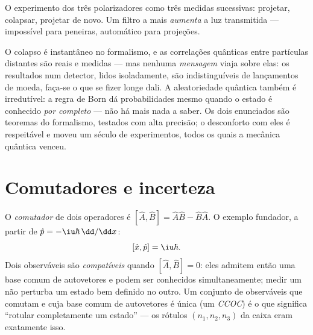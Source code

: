 \begin{omfigure}

{\small O experimento dos três polarizadores como três medidas
sucessivas: projetar, colapsar, projetar de novo. Um filtro a mais
\emph{aumenta} a luz transmitida --- impossível para peneiras,
automático para projeções.}
\end{omfigure}

\begin{remark}\label{rem:b3:quantum-formalism:nosignal}
O colapso é instantâneo no formalismo, e as correlações quânticas
entre partículas distantes são reais e medidas --- mas nenhuma
\emph{mensagem} viaja sobre elas: os resultados num detector, lidos
isoladamente, são indistinguíveis de lançamentos de moeda, faça-se o
que se fizer longe dali. A aleatoriedade quântica também é
irredutível: a regra de Born dá probabilidades mesmo quando o estado é
conhecido \emph{por completo} --- não há mais nada a saber. Os dois
enunciados são teoremas do formalismo, testados com alta precisão; o
desconforto com eles é respeitável e moveu um século de experimentos,
todos os quais a mecânica quântica venceu.
\end{remark}

\section{Comutadores e incerteza}

\begin{definition}\label{def:b3:quantum-formalism:commutator}
O \emph{comutador} de dois operadores é $[\hat A, \hat B] = \hat
A\hat B - \hat B\hat A$. O exemplo fundador, a partir de $\hat p =
-\iu\hbar\,\dd/\dd x$:
\[
[\hat x, \hat p] = \iu\hbar .
\]
Dois observáveis são \emph{compatíveis} quando $[\hat A, \hat B] = 0$:
eles admitem então uma base comum de autovetores e podem ser
conhecidos simultaneamente; medir um não perturba um estado bem
definido no outro. Um conjunto de observáveis que comutam e cuja base
comum de autovetores é única (um \emph{CCOC}) é o que significa
``rotular completamente um estado'' --- os rótulos $(n_1, n_2, n_3)$
da caixa eram exatamente isso.
\end{definition}

